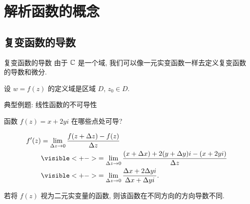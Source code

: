 \section{解析函数的概念}

\subsection{复变函数的导数}
\begin{frame}{复变函数的导数}
\onslide<+->
由于 ${\mathbb{C}}$ 是一个域, 我们可以像一元实变函数一样去定义复变函数的导数和微分.
\onslide<+->
\begin{definition}
设 $w=f(z)$ 的定义域是区域 $D$, $z_0\in D$.

\end{definition}
\end{frame}


\begin{frame}{典型例题: 线性函数的不可导性}
\beqskip{4pt}
\onslide<+->
\begin{example}
函数 $f(z)=x+2yi$ 在哪些点处可导?
\end{example}
\onslide<+->
\begin{solution}
\vspace{-0.5\baselineskip}
\begin{align*}
f'(z)&=\lim_{\Delta z\to 0}\frac{f(z+\Delta z)-f(z)}{\Delta z}\\
&\visible<+->{=\lim_{\Delta z\to 0}\frac{(x+\Delta x)+2(y+\Delta y)i-(x+2yi)}{\Delta z}}\\
&\visible<+->{=\lim_{\Delta z\to 0}\frac{\Delta x+2\Delta y i}{\Delta x+\Delta yi}.}
\end{align*}
\end{solution}
\onslide<+->
若将 $f(z)$ 视为二元实变量的函数, 则该函数在不同方向的方向导数不同.
\endgroup
\end{frame}


